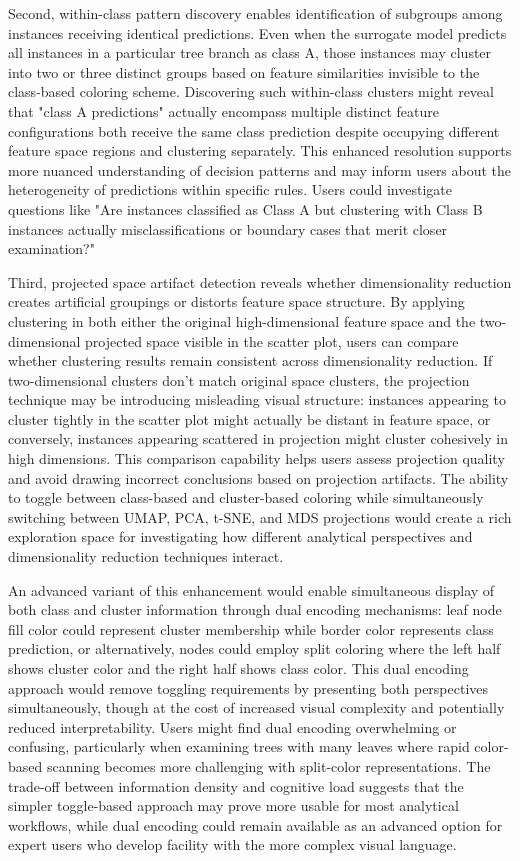 Second, within-class pattern discovery enables identification of subgroups among instances receiving identical predictions. Even when the surrogate model predicts all instances in a particular tree branch as class A, those instances may cluster into two or three distinct groups based on feature similarities invisible to the class-based coloring scheme. Discovering such within-class clusters might reveal that "class A predictions" actually encompass multiple distinct feature configurations both receive the same class prediction despite occupying different feature space regions and clustering separately. This enhanced resolution supports more nuanced understanding of decision patterns and may inform users about the heterogeneity of predictions within specific rules. Users could investigate questions like "Are instances classified as Class A but clustering with Class B instances actually misclassifications or boundary cases that merit closer examination?"

Third, projected space artifact detection reveals whether dimensionality reduction creates artificial groupings or distorts feature space structure. By applying clustering in both either the original high-dimensional feature space and the two-dimensional projected space visible in the scatter plot, users can compare whether clustering results remain consistent across dimensionality reduction. If two-dimensional clusters don't match original space clusters, the projection technique may be introducing misleading visual structure: instances appearing to cluster tightly in the scatter plot might actually be distant in feature space, or conversely, instances appearing scattered in projection might cluster cohesively in high dimensions. This comparison capability helps users assess projection quality and avoid drawing incorrect conclusions based on projection artifacts. The ability to toggle between class-based and cluster-based coloring while simultaneously switching between UMAP, PCA, t-SNE, and MDS projections would create a rich exploration space for investigating how different analytical perspectives and dimensionality reduction techniques interact.

An advanced variant of this enhancement would enable simultaneous display of both class and cluster information through dual encoding mechanisms: leaf node fill color could represent cluster membership while border color represents class prediction, or alternatively, nodes could employ split coloring where the left half shows cluster color and the right half shows class color. This dual encoding approach would remove toggling requirements by presenting both perspectives simultaneously, though at the cost of increased visual complexity and potentially reduced interpretability. Users might find dual encoding overwhelming or confusing, particularly when examining trees with many leaves where rapid color-based scanning becomes more challenging with split-color representations. The trade-off between information density and cognitive load suggests that the simpler toggle-based approach may prove more usable for most analytical workflows, while dual encoding could remain available as an advanced option for expert users who develop facility with the more complex visual language.

